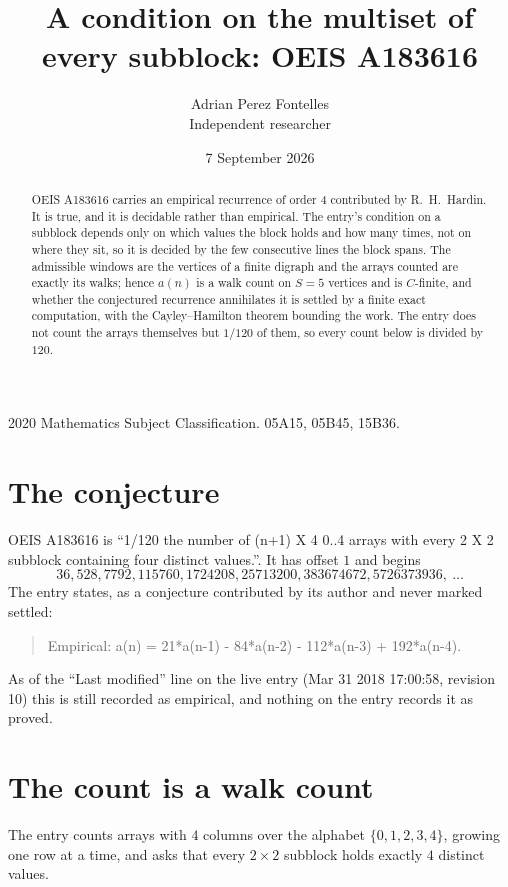 \documentclass[11pt,a4paper]{article}
\title{A condition on the multiset of every subblock: OEIS A183616}
\author{Adrian Perez Fontelles\\ \small Independent researcher}
\date{7 September 2026}
\theoremstyle{plain}
\theoremstyle{definition}
\begin{document}
\maketitle

\begin{abstract}
OEIS A183616 carries an empirical recurrence of order $4$ contributed by R.~H.~Hardin. It is
true, and it is decidable rather than empirical. The entry's condition on a subblock depends
only on which values the block holds and how many times, not on where they sit, so it is
decided by the few consecutive lines the block spans. The admissible windows are the vertices
of a finite digraph and the arrays counted are exactly its walks; hence $a(n)$ is a walk count
on $S=5$ vertices and is $C$-finite, and whether the conjectured recurrence annihilates it
is settled by a finite exact computation, with the Cayley--Hamilton theorem bounding the
work. The entry does not count the arrays themselves but $1/120$ of them, so every count below is divided by $120$.
\end{abstract}

\noindent\small 2020 Mathematics Subject Classification. 05A15, 05B45, 15B36.\normalsize

\section{The conjecture}

OEIS A183616 is ``1/120 the number of (n+1) X 4 0..4 arrays with every 2 X 2 subblock containing four distinct values.''. It has offset $1$ and begins
\[
36, 528, 7792, 115760, 1724208, 25713200, 383674672, 5726373936,\ \dots
\]
The entry states, as a conjecture contributed by its author and never marked settled:
\begin{quote}
Empirical: a(n) = 21*a(n-1) - 84*a(n-2) - 112*a(n-3) + 192*a(n-4).
\end{quote}
As of the ``Last modified'' line on the live entry (Mar 31 2018 17:00:58, revision 10) this is still
recorded as empirical, and nothing on the entry records it as proved.

\section{The count is a walk count}

The entry counts arrays with $4$ columns over the alphabet $\{0,1,2,3,4\}$, growing one row at a time, and asks that every $2\times2$ subblock holds exactly $4$ distinct values.
\end{document}
